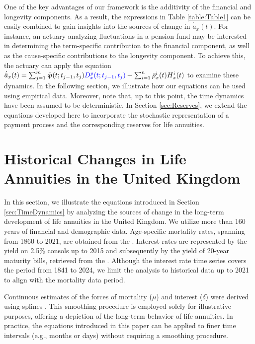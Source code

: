 \documentclass[12pt]{article}
\newcommand{\revision}[1]{\textcolor{blue}{#1}}
\begin{document}
One of the key advantages of our framework is the additivity of the financial and longevity components. As a result, the expressions in Table \ref{table:Table1} can be easily combined to gain insights into the sources of change in $\acute{\bar{a}}_x(t)$. For instance, an actuary analyzing fluctuations in a pension fund may be interested in determining the term-specific contribution to the financial component, as well as the cause-specific contributions to the longevity component. To achieve this, the actuary can apply the equation 
$\acute{\bar{a}}_x(t)=\sum_{j=1}^m\bar{\upvarphi}(t;t_{j-1},t_{j})\revision{{D}^p_x(t;t_{j-1},t_{j})}+\sum_{i=1}^{n} \bar{\rho}{^i_x}(t){H}^{i}_x(t)$ to examine these dynamics. In the following section, we illustrate how our equations can be used using empirical data. Moreover, note that, up to this point, the time dynamics have been assumed to be deterministic. In Section \ref{sec:Reserves}, we extend the equations developed here to incorporate the stochastic representation of a payment process and the corresponding reserves for life annuities. 



\section{Historical Changes in Life Annuities in the United Kingdom}\label{sec:UK_Illustration}

In this section, we illustrate the equations introduced in Section \ref{sec:TimeDynamics} by analyzing the sources of change in the long-term development of life annuities in the United Kingdom. We utilize more than 160 years of financial and demographic data. Age-specific mortality rates, spanning from 1860 to 2021, are obtained from the \citet{HMD2024}. Interest rates are represented by the yield on 2.5\% consols up to 2015 and subsequently by the yield of 20-year maturity bills, retrieved from the \citet{BankOfEngland2024}. Although the interest rate time series covers the period from 1841 to 2024, we limit the analysis to historical data up to 2021 to align with the mortality data period.

Continuous estimates of the forces of mortality (\(\mu\)) and interest (\(\delta\)) were derived using splines \citep{green1993nonparametric,camarda2012mortalitysmooth}. This smoothing procedure is employed solely for illustrative purposes, offering a depiction of the long-term behavior of life annuities. In practice, the equations introduced in this paper can be applied to finer time intervals (e.g., months or days) without requiring a smoothing procedure.
\end{document}
